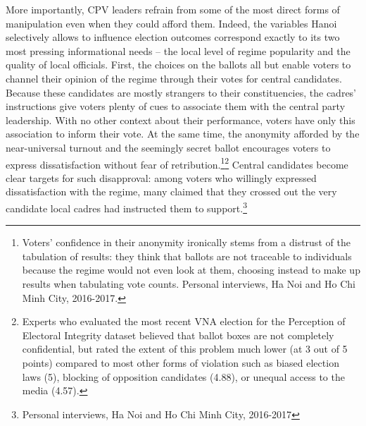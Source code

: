 \documentclass[12pt]{article}
\newcommand\fnote[1]{\footnote{\baselineskip=2\normalbaselineskip#1}}
\newcommand{\1}{\mathbbm{1}}
\begin{document}
More importantly, CPV leaders refrain from some of the most direct forms of manipulation even when they could afford them. Indeed, the variables Hanoi selectively allows to influence election outcomes correspond exactly to its two most pressing informational needs -- the local level of regime popularity and the quality of local officials. First, the choices on the ballots all but enable voters to channel their opinion of the regime through their votes for central candidates. Because these candidates are mostly strangers to their constituencies, the cadres' instructions give voters plenty of cues to associate them with the central party leadership. With no other context about their performance, voters have only this association to inform their vote. At the same time, the anonymity afforded by the near-universal turnout and the seemingly secret ballot encourages voters to express dissatisfaction without fear of retribution.\fnote{Voters' confidence in their anonymity ironically stems from a distrust of the tabulation of results: they think that ballots are not traceable to individuals because the regime would not even look at them, choosing instead to make up results when tabulating vote counts. Personal interviews, Ha Noi and Ho Chi Minh City, 2016-2017.}\fnote{Experts who evaluated the most recent VNA election for the Perception of Electoral Integrity dataset \citep{PEI} believed that ballot boxes are not completely confidential, but rated the extent of this problem much lower (at 3 out of 5 points) compared to most other forms of violation such as biased election laws (5), blocking of opposition candidates (4.88), or unequal access to the media (4.57).} Central candidates become clear targets for such disapproval: among voters who willingly expressed dissatisfaction with the regime, many claimed that they crossed out the very candidate local cadres had instructed them to support.\fnote{Personal interviews, Ha Noi and Ho Chi Minh City, 2016-2017}
\end{document}
